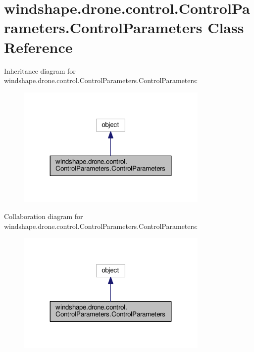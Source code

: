 \hypertarget{classwindshape_1_1drone_1_1control_1_1_control_parameters_1_1_control_parameters}{}\section{windshape.\+drone.\+control.\+Control\+Parameters.\+Control\+Parameters Class Reference}
\label{classwindshape_1_1drone_1_1control_1_1_control_parameters_1_1_control_parameters}


Inheritance diagram for windshape.\+drone.\+control.\+Control\+Parameters.\+Control\+Parameters\+:\nopagebreak
\begin{figure}[H]
\begin{center}
\leavevmode
\includegraphics[width=263pt]{classwindshape_1_1drone_1_1control_1_1_control_parameters_1_1_control_parameters__inherit__graph}
\end{center}
\end{figure}


Collaboration diagram for windshape.\+drone.\+control.\+Control\+Parameters.\+Control\+Parameters\+:\nopagebreak
\begin{figure}[H]
\begin{center}
\leavevmode
\includegraphics[width=263pt]{classwindshape_1_1drone_1_1control_1_1_control_parameters_1_1_control_parameters__coll__graph}
\end{center}
\end{figure}
